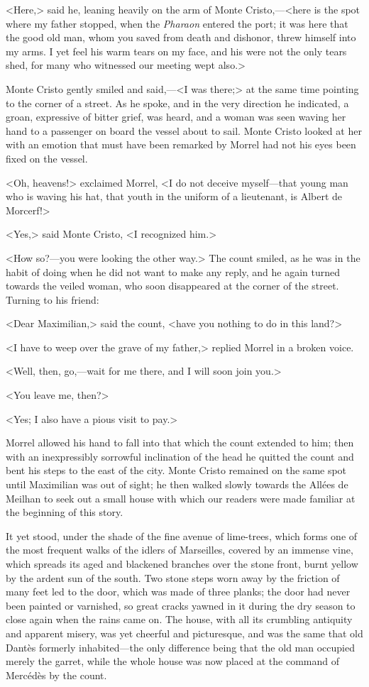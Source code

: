  <Here,> said he, leaning heavily on the arm of Monte Cristo,—<here is the spot where my father stopped, when the \textit{Pharaon} entered the port; it was here that the good old man, whom you saved from death and dishonor, threw himself into my arms. I yet feel his warm tears on my face, and his were not the only tears shed, for many who witnessed our meeting wept also.> 

 Monte Cristo gently smiled and said,—<I was there;> at the same time pointing to the corner of a street. As he spoke, and in the very direction he indicated, a groan, expressive of bitter grief, was heard, and a woman was seen waving her hand to a passenger on board the vessel about to sail. Monte Cristo looked at her with an emotion that must have been remarked by Morrel had not his eyes been fixed on the vessel. 

 <Oh, heavens!> exclaimed Morrel, <I do not deceive myself—that young man who is waving his hat, that youth in the uniform of a lieutenant, is Albert de Morcerf!> 

 <Yes,> said Monte Cristo, <I recognized him.> 

 <How so?—you were looking the other way.>  The count smiled, as he was in the habit of doing when he did not want to make any reply, and he again turned towards the veiled woman, who soon disappeared at the corner of the street. Turning to his friend: 

 <Dear Maximilian,> said the count, <have you nothing to do in this land?> 

 <I have to weep over the grave of my father,> replied Morrel in a broken voice. 

 <Well, then, go,—wait for me there, and I will soon join you.> 

 <You leave me, then?> 

 <Yes; I also have a pious visit to pay.> 

 Morrel allowed his hand to fall into that which the count extended to him; then with an inexpressibly sorrowful inclination of the head he quitted the count and bent his steps to the east of the city. Monte Cristo remained on the same spot until Maximilian was out of sight; he then walked slowly towards the Allées de Meilhan to seek out a small house with which our readers were made familiar at the beginning of this story. 

 It yet stood, under the shade of the fine avenue of lime-trees, which forms one of the most frequent walks of the idlers of Marseilles, covered by an immense vine, which spreads its aged and blackened branches over the stone front, burnt yellow by the ardent sun of the south. Two stone steps worn away by the friction of many feet led to the door, which was made of three planks; the door had never been painted or varnished, so great cracks yawned in it during the dry season to close again when the rains came on. The house, with all its crumbling antiquity and apparent misery, was yet cheerful and picturesque, and was the same that old Dantès formerly inhabited—the only difference being that the old man occupied merely the garret, while the whole house was now placed at the command of Mercédès by the count. 

